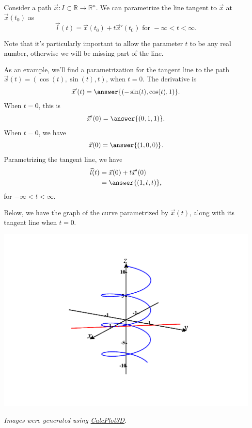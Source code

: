 \documentclass{ximera}
\begin{document}
\begin{proposition}
Consider a path $\vec{x}:I\subset\mathbb{R}\rightarrow\mathbb{R}^n$. We can parametrize the line tangent to $\vec{x}$ at $\vec{x}(t_0)$ as
\[
\vec{l}(t) = \vec{x}(t_0) + t\vec{x}'(t_0) \textrm{ for } -\infty < t < \infty.
\]
\end{proposition}

Note that it's particularly important to allow the parameter $t$ to be any real number, otherwise we will be missing part of the line.

\begin{example}
As an example, we'll find a parametrization for the tangent line to the path $\vec{x}(t)=(\cos(t),\sin(t),t)$, when $t=0$. The derivative is
\[
\vec{x}'(t) = \answer{(-\sin(t),\cos(t),1)}.
\]
When $t=0$, this is
\[
\vec{x}'(0) = \answer{(0,1,1)}.
\]
When $t=0$, we have
\[
\vec{x}(0) = \answer{(1,0,0)}.
\]
Parametrizing the tangent line, we have
\begin{align*}
\vec{l}(t) &= \vec{x}(0) + t\vec{x}'(0)\\
&= \answer{(1,t,t)},
\end{align*}
for $-\infty < t < \infty$.

Below, we have the graph of the curve parametrized by $\vec{x}(t)$, along with its tangent line when $t=0$.

\begin{image}
\includegraphics[width=\textwidth]{CalcPlot3D-tangent_line}
\end{image}
\end{example}

\textit{Images were generated using \href{https://www.monroecc.edu/faculty/paulseeburger/calcnsf/CalcPlot3D/}{CalcPlot3D}.}
\end{document}
